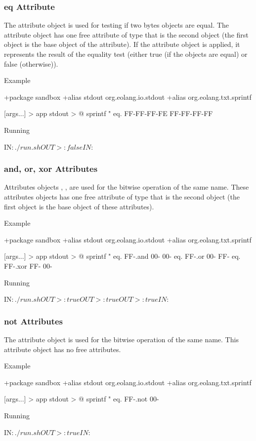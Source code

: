 \documentclass[12pt]{book}
\begin{document}
\subsubsection{eq Attribute}
The  attribute object is used for testing if two bytes objects are equal. The  attribute object has one free attribute of type  that is the second object (the first object is the base object of the  attribute).
If the  attribute object is applied, it represents the result of the equality test (either true (if the objects are equal) or false (otherwise)).

Example
\begin{ffcode}
+package sandbox
+alias stdout org.eolang.io.stdout
+alias org.eolang.txt.sprintf

[args...] > app
stdout > @
  sprintf
    "%
    eq.
     FF-FF-FF-FE
     FF-FF-FF-FF

Running

IN$: ./run.sh
OUT>: false
IN$: 
\end{ffcode}

\subsubsection{and, or, xor Attributes}
Attributes objects , ,  are used for the bitwise operation of the same name. These attributes objects has one free attribute of type  that is the second object (the first object is the base object of these attributes).

Example
\begin{ffcode}
+package sandbox
+alias stdout org.eolang.io.stdout
+alias org.eolang.txt.sprintf

[args...] > app
  stdout > @
    sprintf
      "%
      eq.
        FF-.and 00-
        00-
      eq.
        FF-.or 00-
        FF-
      eq.
        FF-.xor FF-
        00-
    
Running

IN$: ./run.sh
OUT>: true
OUT>: true
OUT>: true
IN$: 
\end{ffcode}

\subsubsection{not Attributes}
The  attribute object is used for the bitwise operation of the same name. This attribute object has no free attributes.

Example
\begin{ffcode}
+package sandbox
+alias stdout org.eolang.io.stdout
+alias org.eolang.txt.sprintf
    
[args...] > app
  stdout > @
    sprintf
      "%
      eq.
        FF-.not
        00-
    
Running
    
IN$: ./run.sh
OUT>: true
IN$: 
\end{ffcode}
\end{document}
